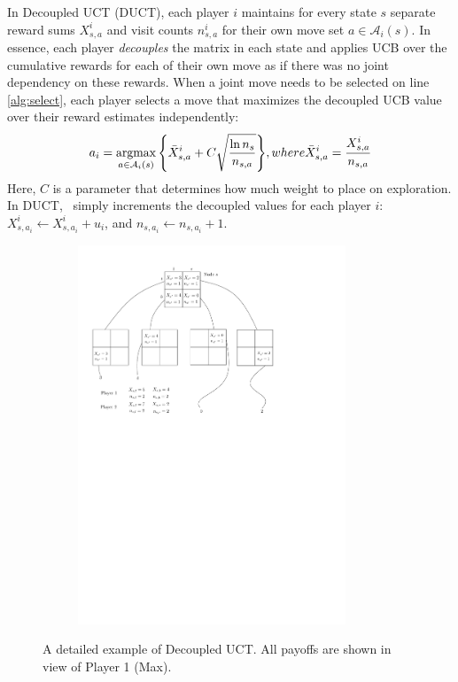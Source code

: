 \documentclass[conference]{IEEEtran}
\newcommand{\argmax}{\operatornamewithlimits{argmax}}
\newcommand{\cA}{\mathcal{A}}
\begin{document}
In Decoupled UCT (DUCT), each player $i$ maintains for every state $s$ separate reward sums $X^i_{s,a}$ and 
visit counts $n^i_{s,a}$ for their own move set $a \in \cA_i(s)$. 
In essence, each player {\it decouples} the matrix in each state and applies UCB over the cumulative rewards for 
each of their own move as if there was no joint dependency on these rewards.
When a joint move needs to be selected on line 
\ref{alg:select}, each player selects a move that maximizes the decoupled UCB value over their reward estimates 
independently:
\begin{equation}
\label{eq:duct}
a_i = \argmax_{a \in \cA_i(s)}{ \left\{ \bar{X}^i_{s,a} + C \sqrt{\frac{\ln n_s}{n_{s,a}}} \right\} }, 
  \mbox{ where } \bar{X}^i_{s,a} = \frac{X^i_{s,a}}{n_{s,a}}
\end{equation}
\noindent Here, $C$ is a parameter that determines how much weight to place on exploration. 
In DUCT, \Update~simply increments the decoupled values for each player $i$: $X^i_{s,a_i} \leftarrow X^i_{s,a_i} + u_i$,
and $n_{s,a_i} \leftarrow n_{s,a_i} + 1$. 

\begin{figure}[t!]
\centering
\begin{subfigure}{8cm}
\centering
\includegraphics[width=8.0cm]{figures/tree3}\\
\end{subfigure}
\caption{A detailed example of Decoupled UCT. All payoffs are shown in view of Player 1 (Max).\label{fig:example2}}
\end{figure}
\end{document}
